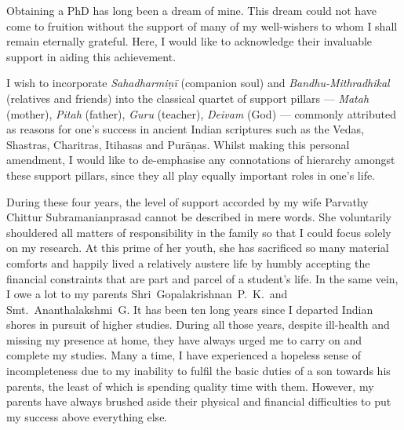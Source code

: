 
\vspace*{-13mm}

\addlines[0.5]

Obtaining a PhD has long been a dream of mine. This dream could not have come to
fruition without the support of many of my well-wishers to whom I shall remain
eternally grateful. Here, I would like to acknowledge their invaluable support
in aiding this achievement.

I wish to incorporate \emph{Sahadharmiṇī} (companion soul) and
\emph{Bandhu-Mithradhikal} (relatives and friends) into the classical quartet of
support pillars --- \emph{Matah} (mother), \emph{Pitah} (father), \emph{Guru}
(teacher), \emph{Deivam} (God) --- commonly attributed as reasons for one's
success in ancient Indian scriptures such as the Vedas, Shastras, Charitras,
Itihasas and Purāṇas. Whilst making this personal amendment, I would like to
de-emphasise any connotations of hierarchy amongst these support pillars, since
they all play equally important roles in one's life.

During these four years, the level of support accorded by my wife Parvathy Chittur
Subramanianprasad cannot be described in mere words. She voluntarily shouldered
all matters of responsibility in the family so that I could focus solely on my
research. At this prime of her youth, she has sacrificed so many material
comforts and happily lived a relatively austere life by humbly accepting the
financial constraints that are part and parcel of a student's life. In the same
vein, I owe a lot to my parents Shri~Gopalakrishnan~P.~K.\ and
Smt.~Ananthalakshmi~G. It has been ten long years since I departed Indian shores
in pursuit of higher studies. During all those years, despite ill-health and
missing my presence at home, they have always urged me to carry on and complete
my studies. Many a time, I have experienced a hopeless sense of incompleteness
due to my inability to fulfil the basic duties of a son towards his parents, the
least of which is spending quality time with them. However, my parents have
always brushed aside their physical and financial difficulties to put my success
above everything else.

